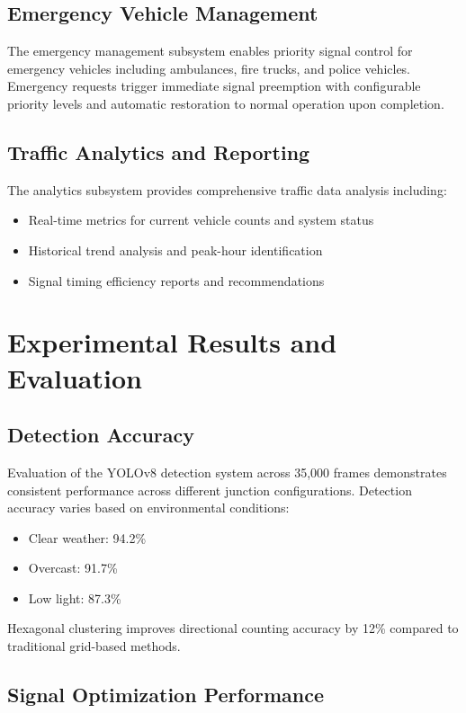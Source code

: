 \documentclass[conference]{IEEEtran}
\begin{document}
\subsection{Emergency Vehicle Management}

The emergency management subsystem enables priority signal control for emergency vehicles including ambulances, fire trucks, and police vehicles. Emergency requests trigger immediate signal preemption with configurable priority levels and automatic restoration to normal operation upon completion.

\subsection{Traffic Analytics and Reporting}

The analytics subsystem provides comprehensive traffic data analysis including:
\begin{itemize}
\item Real-time metrics for current vehicle counts and system status
\item Historical trend analysis and peak-hour identification
\item Signal timing efficiency reports and recommendations
\end{itemize}

\section{Experimental Results and Evaluation}

\subsection{Detection Accuracy}

Evaluation of the YOLOv8 detection system across 35,000 frames demonstrates consistent performance across different junction configurations. Detection accuracy varies based on environmental conditions:
\begin{itemize}
\item Clear weather: 94.2\%
\item Overcast: 91.7\%
\item Low light: 87.3\%
\end{itemize}

Hexagonal clustering improves directional counting accuracy by 12\% compared to traditional grid-based methods.

\subsection{Signal Optimization Performance}
\end{document}
